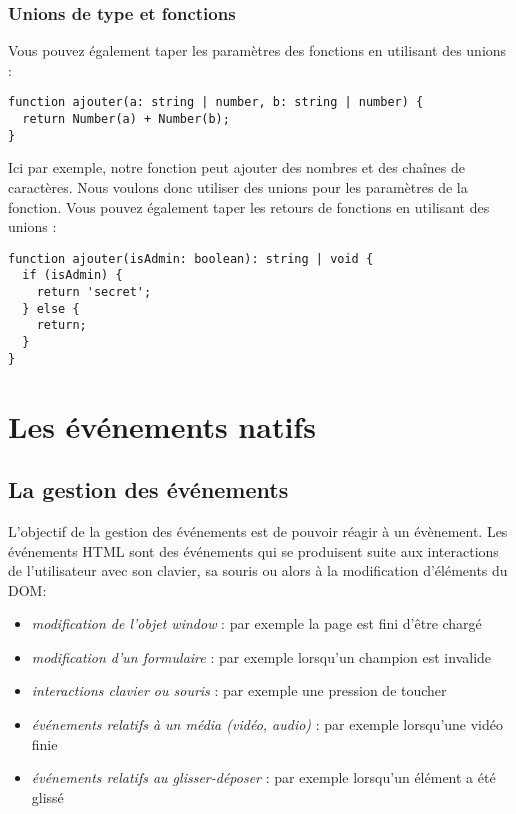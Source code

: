 \subsubsection{Unions de type et fonctions}
Vous pouvez également taper les paramètres des fonctions en utilisant des unions :
\begin{verbatim}
function ajouter(a: string | number, b: string | number) {
  return Number(a) + Number(b);
}
\end{verbatim}

Ici par exemple, notre fonction peut ajouter des nombres et des chaînes de caractères. Nous voulons donc utiliser des unions pour les paramètres de la fonction. Vous pouvez également taper les retours de fonctions en utilisant des unions :
\begin{verbatim}
function ajouter(isAdmin: boolean): string | void {
  if (isAdmin) {
    return 'secret';
  } else {
    return;
  }
}
\end{verbatim}



\section{Les événements natifs}
\subsection{La gestion des événements}
L'objectif de la gestion des événements est de pouvoir réagir à un évènement. Les événements HTML sont des événements qui se produisent suite aux interactions de l'utilisateur avec son clavier, sa souris ou alors à la modification d'éléments du DOM:
\begin{itemize}
\item {\em modification de l'objet {\color{monOrange}window}} : par exemple la page est fini d'être chargé
\item {\em modification d'un formulaire }: par exemple lorsqu'un champion est invalide
\item {\em interactions clavier ou souris }: par exemple une pression de toucher
\item {\em événements relatifs à un média (vidéo, audio) }: par exemple lorsqu'une vidéo finie
\item {\em événements relatifs au glisser-déposer }: par exemple lorsqu'un élément a été glissé
\end{itemize}

